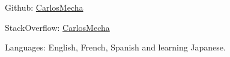 
\begin{rlist}
  \item Github: \href{https://github.com/CarlosMecha}{CarlosMecha}
  \item StackOverflow: \href{http://stackoverflow.com/users/1849720/carlosmecha}{CarlosMecha}
  \item Languages: English, French, Spanish and learning Japanese.
\end{rlist}

